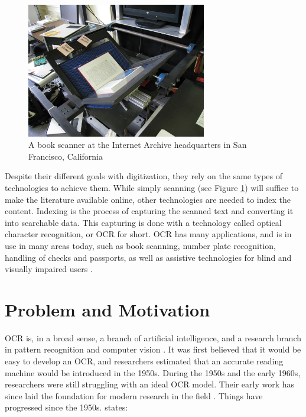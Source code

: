\begin{figure}[ht]
    \centering
    \includegraphics[width=0.7\textwidth]{fig/chapter1/Internet_Archive_book_scanner_1.jpg}
    \captionsetup{justification=centering}
    \caption{A book scanner at the Internet Archive headquarters in San Francisco, California}
    \label{ref:book_scanner}
\end{figure}

Despite their different goals with digitization, they rely on the same types of technologies to achieve them. While simply scanning (see Figure \ref{ref:book_scanner}) will suffice to make the literature available online, other technologies are needed to index the content. Indexing is the process of capturing the scanned text and converting it into searchable data. This capturing is done with a technology called optical character recognition, or OCR for short. OCR has many applications, and is in use in many areas today, such as book scanning, number plate recognition, handling of checks and passports, as well as assistive technologies for blind and visually impaired users \citep{mori1999optical, kurzweil2000reading}.


\section{Problem and Motivation}
\label{sec:problem_motivation}
OCR is, in a broad sense, a branch of artificial intelligence, and a research branch in pattern recognition and computer vision \citep{mori1999optical}. It was first believed that it would be easy to develop an OCR, and researchers estimated that an accurate reading machine would be introduced in the 1950s. During the 1950s and the early 1960s, researchers were still struggling with an ideal OCR model. Their early work has since laid the foundation for modern research in the field \citep{mori1992historical}. Things have progressed since the 1950s. \cite{ye2015text} states:

